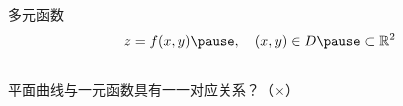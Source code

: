 \begin{frame}
	\linespread{1.2}
	\begin{block}{多元函数}\pause 
		$$z=f(x,y)\pause ,\quad (x,y)\in D\pause \subset\mathbb{R}^2$$
		\vspace{-1em}
	\end{block}\pause 
	\vspace{-1ex}
	\begin{columns}
		\begin{center}
		\end{center}\pause 
		\begin{center}
		\end{center}
	\end{columns}\pause 
 	\vspace{1ex}
	{}平面曲线与一元函数具有一一对应关系？\pause （\alert{$\times$}）
\end{frame}

